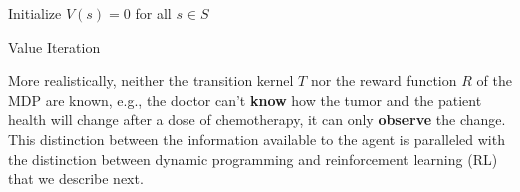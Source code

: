 \begin{algorithm}
    Initialize $V(s) = 0$ for all $s \in S$ \\
    \caption{Value Iteration}\label{alg:value_iteration}
\end{algorithm}

More realistically, neither the transition kernel $T$ nor the reward function $R$ of the MDP are known, e.g., the doctor can't \textbf{know} how the tumor and the patient health will change after a dose of chemotherapy, it can only \textbf{observe} the change. This distinction between the information available to the agent is paralleled with the distinction between dynamic programming and reinforcement learning (RL) that we describe next. 
